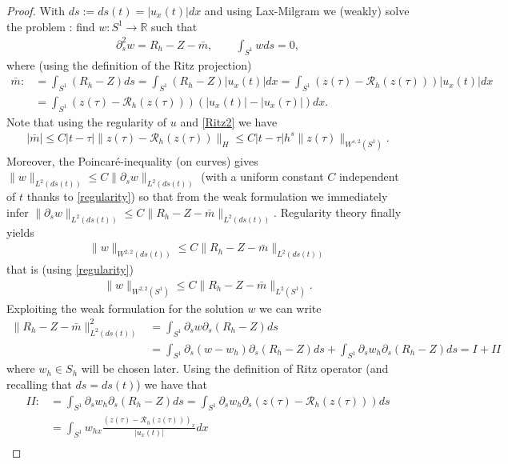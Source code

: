 \documentclass[10pt,a4paper]{amsart}
\newcommand{\R}{\mathbb{R}}
\begin{document}
\begin{proof}
With $ds:=ds(t)=|u_{x}(t)|dx$ and using Lax-Milgram we (weakly) solve the problem : find $w:S^{1} \to \R$ such that
\begin{align*}
\partial^{2}_{s} w = R_{h}-Z -\bar{m}, \qquad \int_{S^{1}}w ds=0,
\end{align*}
where (using the definition of the Ritz projection)
\begin{align*} \bar{m}:&=\int_{S^{1}}(R_{h}-Z) ds=\int_{S^{1}}(R_{h}-Z) |u_{x}(t)|dx= \int_{S^{1}} (z(\tau) -\mathcal{R}_{h}(z(\tau)))|u_{x}(t)|dx\\
&= \int_{S^{1}} (z(\tau) -\mathcal{R}_{h}(z(\tau)))(|u_{x}(t)|- |u_{x}(\tau)|)dx .
\end{align*}
Note that using the regularity of $u$ and \eqref{Ritz2} we have
\begin{align}\label{mbarest}
|\bar{m}| \leq C |t-\tau|\|z(\tau) -\mathcal{R}_{h}(z(\tau))\|_{H} \leq C |t-\tau| h^{s}\|z(\tau)\|_{W^{s,2}(S^{1})}.
\end{align}
Moreover, the Poincar\'{e}-inequality (on curves) gives $\| w\|_{L^{2}(ds(t))} \leq C\|\partial_{s} w\|_{L^{2}(ds(t))}$ (with a uniform constant $C$ independent of $t$ thanks to \eqref{regularity})
so that from the weak formulation we immediately infer
$\|\partial_{s} w\|_{L^{2}(ds(t))} \leq C \| R_{h}-Z -\bar{m} \|_{L^{2}(ds(t))} $.
Regularity theory finally yields
\begin{align*}
\| w \|_{W^{2,2}(ds(t))} \leq C \| R_{h}-Z -\bar{m} \|_{L^{2}(ds(t))}
\end{align*}
that is (using \eqref{regularity})
\begin{align}\label{reg-ww}
\| w \|_{W^{2,2}(S^{1})} \leq C \| R_{h}-Z -\bar{m} \|_{L^{2}(S^{1})}.
\end{align}
Exploiting the weak formulation for the solution $w$ we can write
\begin{align*}
\| R_{h}-Z -\bar{m}\|_{L^{2}(ds(t))}^{2} &=\int_{S^{1}} \partial_{s} w \partial_{s} (R_{h}-Z) ds
\\
&=\int_{S^{1}} \partial_{s} (w -w_{h})\partial_{s} (R_{h}-Z) ds + \int_{S^{1}} \partial_{s} w_{h}\partial_{s} (R_{h}-Z) ds=I+II
\end{align*}
where $w_{h} \in S_{h}$ will be chosen later. Using the definition of Ritz operator (and recalling that $ds=ds(t)$) we have that
\begin{align*}
II:&=\int_{S^{1}} \partial_{s} w_{h}\partial_{s} (R_{h}-Z) ds=\int_{S^{1}} \partial_{s} w_{h}\partial_{s} (z(\tau)-\mathcal{R}_{h}(z(\tau))) ds\\
&=\int_{S^{1}} w_{hx}\frac{(z(\tau)-\mathcal{R}_{h}(z(\tau)))_{x}}{|u_{x}(t)|} dx \\

\end{align*}
\end{proof}
\end{document}
